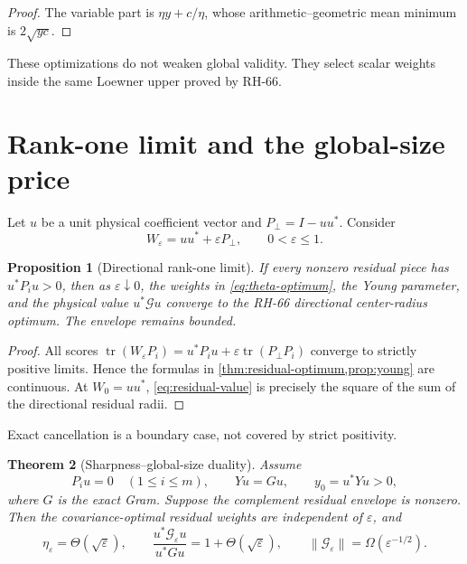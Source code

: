 \documentclass[11pt]{article}
\newtheorem{theorem}{Theorem}[section]
\newtheorem{proposition}[theorem]{Proposition}
\newcommand{\norm}[1]{\left\lVert#1\right\rVert}
\newcommand{\tr}{\operatorname{tr}}
\begin{document}
\begin{proof}
The variable part is $\eta y+c/\eta$, whose arithmetic--geometric mean
minimum is $2\sqrt{yc}$.
\end{proof}

These optimizations do not weaken global validity.  They select scalar
weights inside the same Loewner upper proved by RH-66.

\section{Rank-one limit and the global-size price}
\label{sec:tradeoff}

Let $u$ be a unit physical coefficient vector and
$P_\perp=I-uu^*$.  Consider
\begin{equation}
 W_\varepsilon=uu^*+\varepsilon P_\perp,
 \qquad 0<\varepsilon\le1.
 \label{eq:regularized-covariance}
\end{equation}

\begin{proposition}[Directional rank-one limit]
\label{prop:rank-one}
If every nonzero residual piece has $u^*P_iu>0$, then as
$\varepsilon\downarrow0$, the weights in \eqref{eq:theta-optimum}, the Young
parameter, and the physical value $u^*\mathcal G u$ converge to the RH-66
directional center-radius optimum.  The envelope remains bounded.
\end{proposition}

\begin{proof}
All scores
$\tr(W_\varepsilon P_i)=u^*P_iu+\varepsilon\tr(P_\perp P_i)$ converge to
strictly positive limits.  Hence the formulas in
\cref{thm:residual-optimum,prop:young} are continuous.  At
$W_0=uu^*$, \eqref{eq:residual-value} is precisely the square of the sum of
the directional residual radii.
\end{proof}

Exact cancellation is a boundary case, not covered by strict positivity.

\begin{theorem}[Sharpness--global-size duality]
\label{thm:duality}
Assume
\begin{equation}
 P_iu=0\quad(1\le i\le m),
 \qquad Yu=Gu,
 \qquad y_0=u^*Yu>0,
 \label{eq:exact-annihilation}
\end{equation}
where $G$ is the exact Gram.  Suppose the complement residual envelope is
nonzero.  Then the covariance-optimal residual weights are independent of
$\varepsilon$, and
\begin{equation}
 \eta_\varepsilon=\Theta(\sqrt\varepsilon),
 \qquad
 \frac{u^*\mathcal G_\varepsilon u}{u^*Gu}
 =1+\Theta(\sqrt\varepsilon),
 \qquad
 \norm{\mathcal G_\varepsilon}
 =\Omega(\varepsilon^{-1/2}).
 \label{eq:duality-rates}
\end{equation}
\end{theorem}
\end{document}
